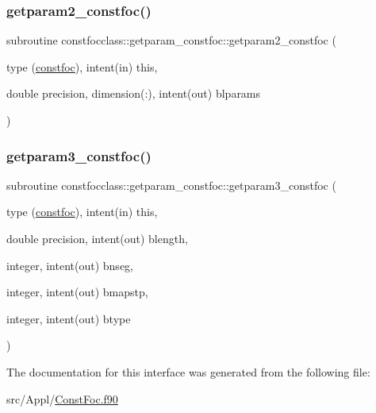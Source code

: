 \mbox{\label{interfaceconstfocclass_1_1getparam__constfoc_a1f8bdcbf64852f3e12b02f785b70c511}} 
\subsubsection{\texorpdfstring{getparam2\_constfoc()}{getparam2\_constfoc()}}
{\footnotesize\ttfamily subroutine constfocclass\+::getparam\+\_\+constfoc\+::getparam2\+\_\+constfoc (\begin{DoxyParamCaption}\item[{type (\mbox{\hyperlink{namespaceconstfocclass_structconstfocclass_1_1constfoc}{constfoc}}), intent(in)}]{this,  }\item[{double precision, dimension(\+:), intent(out)}]{blparams }\end{DoxyParamCaption})}

\mbox{\label{interfaceconstfocclass_1_1getparam__constfoc_a1f661b72d89f0d705b8267d7a16315fb}} 
\subsubsection{\texorpdfstring{getparam3\_constfoc()}{getparam3\_constfoc()}}
{\footnotesize\ttfamily subroutine constfocclass\+::getparam\+\_\+constfoc\+::getparam3\+\_\+constfoc (\begin{DoxyParamCaption}\item[{type (\mbox{\hyperlink{namespaceconstfocclass_structconstfocclass_1_1constfoc}{constfoc}}), intent(in)}]{this,  }\item[{double precision, intent(out)}]{blength,  }\item[{integer, intent(out)}]{bnseg,  }\item[{integer, intent(out)}]{bmapstp,  }\item[{integer, intent(out)}]{btype }\end{DoxyParamCaption})}



The documentation for this interface was generated from the following file\+:\begin{DoxyCompactItemize}
\item 
src/\+Appl/\mbox{\hyperlink{_const_foc_8f90}{Const\+Foc.\+f90}}\end{DoxyCompactItemize}
